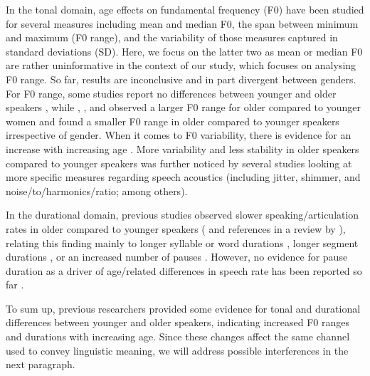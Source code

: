 \documentclass[output=paper]{langscibook}
\begin{document}
In the tonal domain, age effects on fundamental frequency (F0) have been studied for several measures including mean and median F0, the span between minimum and maximum (F0 range), and the variability of those measures captured in standard deviations (SD).
Here, we focus on the latter two as mean or median F0 are rather uninformative in the context of our study, which focuses on analysing F0 range. So far, results are inconclusive and in part divergent between genders. For F0 range, some studies report no differences between younger and older speakers \citep{marko_bona_2010, smiljanic2017}, while \citet{dimitrova_etal_2018}, \citet{tuomainen_hazan2018}, and \citet{hazan2019} observed a larger F0 range for older compared to younger women and \citet{kemper_1998} found a smaller F0 range in older compared to younger speakers irrespective of gender. When it comes to F0 variability, there is evidence for an increase with increasing age \citep{scukanec_etal1992, lortie2015_age-effects, santos_etal2021}. More variability and less stability in older speakers compared to younger speakers was further noticed by several studies looking at more specific measures regarding speech acoustics (including jitter, shimmer, and noise\-/to\-/harmonics\-/ratio; \citealt{goy_etal2013normative,lortie2015_age-effects, rojas2020does} among others).

In the durational domain, previous studies observed slower speaking\fshyp articulation rates in older compared to younger speakers (\citealt{tuomainen_hazan2018, hazan2019, tuomainen2019, tuomainen2021age} and references in a review by \citealt[5]{tucker_etal2021}), relating this finding mainly to longer syllable or word durations \citep{scukanec_etal1996,harnsberger_etal2008, barnes_2013, dimitrova_etal_2018}, longer segment durations \citep{kemper_etal_1995_y+o_speaker+listener,harnsberger_etal2008,smiljanic2017}, or an increased number of pauses \citep{kemper_1998,dimitrova_etal_2018}. However, no evidence for pause duration as a driver of age\-/related differences in speech rate has been reported so far \citep{barnes_2013, smiljanic2017, dimitrova_etal_2018}.

To sum up, previous researchers provided some evidence for tonal and durational differences between younger and older speakers, indicating increased F0 ranges and durations with increasing age. Since these changes affect the same channel used to convey linguistic meaning, we will address possible interferences in the next paragraph.
\end{document}
